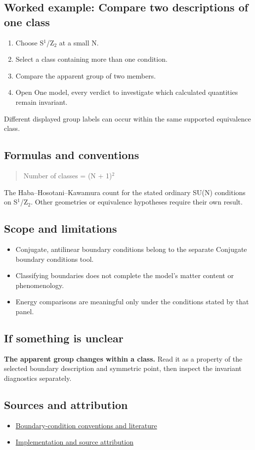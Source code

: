 \documentclass[11pt,a4paper]{article}
\begin{document}
\subsection*{Worked example: Compare two descriptions of one class}
\begin{enumerate}
\item Choose S\ensuremath{{}^{1}}/Z\ensuremath{{}_{2}} at a small N.
\item Select a class containing more than one condition.
\item Compare the apparent group of two members.
\item Open One model, every verdict to investigate which calculated quantities remain invariant.
\end{enumerate}
Different displayed group labels can occur within the same supported equivalence class.
\subsection*{Formulas and conventions}
\begin{quote}Number of classes = (N + 1)\ensuremath{{}^{2}}\end{quote}
The Haba--Hosotani--Kawamura count for the stated ordinary SU(N) conditions on S\ensuremath{{}^{1}}/Z\ensuremath{{}_{2}}. Other geometries or equivalence hypotheses require their own result.

\subsection*{Scope and limitations}
\begin{itemize}
\item Conjugate, antilinear boundary conditions belong to the separate Conjugate boundary conditions tool.
\item Classifying boundaries does not complete the model's matter content or phenomenology.
\item Energy comparisons are meaningful only under the conditions stated by that panel.
\end{itemize}
\subsection*{If something is unclear}
\textbf{The apparent group changes within a class.} Read it as a property of the selected boundary description and symmetric point, then inspect the invariant diagnostics separately.

\subsection*{Sources and attribution}
\begin{itemize}
\item \href{https://karlesmarin.github.io/ghu-explorer/docs/index.html}{Boundary-condition conventions and literature}
\item \href{https://github.com/karlesmarin/ghu-lab/blob/main/src/sections/bcclass_section.js}{Implementation and source attribution}
\end{itemize}
\end{document}
